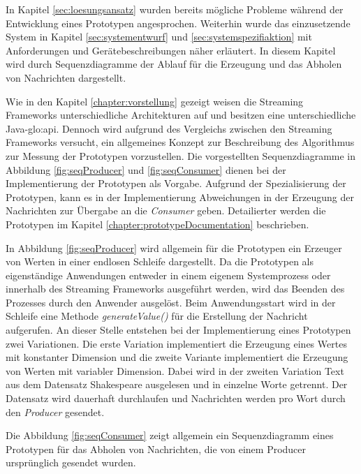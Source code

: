 In Kapitel \ref{sec:loesungsansatz} wurden bereits mögliche Probleme während der Entwicklung eines Prototypen angesprochen. Weiterhin wurde das einzusetzende System in Kapitel \ref{sec:systementwurf} und \ref{sec:systemspezifiaktion} mit Anforderungen und Gerätebeschreibungen näher erläutert. In diesem Kapitel wird durch Sequenzdiagramme der Ablauf für die Erzeugung und das Abholen von Nachrichten dargestellt.

Wie in den Kapitel \ref{chapter:vorstellung} gezeigt weisen die Streaming Frameworks unterschiedliche Architekturen auf und besitzen eine unterschiedliche Java-\gls{glo:api}. Dennoch wird aufgrund des Vergleichs zwischen den Streaming Frameworks versucht, ein allgemeines Konzept zur Beschreibung des Algorithmus zur Messung der Prototypen vorzustellen. Die vorgestellten Sequenzdiagramme in Abbildung \ref{fig:seqProducer} und \ref{fig:seqConsumer} dienen bei der Implementierung der Prototypen als Vorgabe. Aufgrund der Spezialisierung der Prototypen, kann es in der Implementierung Abweichungen in der Erzeugung der Nachrichten zur Übergabe an die \textit{Consumer} geben. Detailierter werden die Prototypen im Kapitel \ref{chapter:prototypeDocumentation} beschrieben.

In Abbildung \ref{fig:seqProducer} wird allgemein für die Prototypen ein Erzeuger von Werten in einer endlosen Schleife dargestellt. Da die Prototypen als eigenständige Anwendungen entweder in einem eigenem Systemprozess oder innerhalb des Streaming Frameworks ausgeführt werden, wird das Beenden des Prozesses durch den Anwender ausgelöst. Beim Anwendungsstart wird in der Schleife eine Methode \textit{generateValue()} für die Erstellung der Nachricht aufgerufen. An dieser Stelle entstehen bei der Implementierung eines Prototypen zwei Variationen. Die erste Variation implementiert die Erzeugung eines Wertes mit konstanter Dimension und die zweite Variante implementiert die Erzeugung von Werten mit variabler Dimension.  Dabei wird in der zweiten Variation Text aus dem Datensatz Shakespeare  ausgelesen und in einzelne Worte getrennt. Der Datensatz wird dauerhaft durchlaufen und Nachrichten werden pro Wort durch den \textit{Producer} gesendet.

Die Abbildung \ref{fig:seqConsumer} zeigt allgemein ein Sequenzdiagramm eines Prototypen für das Abholen von Nachrichten, die von einem Producer ursprünglich gesendet wurden.



